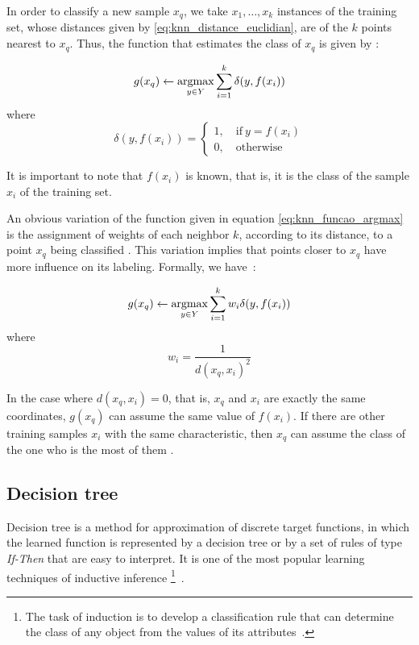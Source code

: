 In order to classify a new sample $x_q$, we take $x_1, \ldots, x_k$ instances of the training set, whose distances given by \ref{eq:knn_distance_euclidian}, are of the $k$ points nearest to $x_q$. Thus, the function that estimates the class of $x_q$ is given by \citep{mitchell:97}:

\begin{equation}
\label{eq:knn_funcao_argmax}
g(x_q) \gets \operatorname*{argmax}_{y \in Y} \sum_{i=1}^k \delta (y, f(x_i))
\end{equation}
\noindent where
\begin{equation}
\label{eq:knn_delta}
  \delta (y, f(x_i)) =  \begin{cases}
                1, \quad \text{if}\ y = f(x_i) \\
                0, \quad \text{otherwise}
              \end{cases}
\end{equation}

It is important to note that $f(x_i)$ is known, that is, it is the class of the sample $x_i$ of the training set.

An obvious variation of the function given in equation \ref{eq:knn_funcao_argmax} is the assignment of weights of each neighbor $k$, according to its distance, to a point $x_q$ being classified \citep{mitchell:97}. This variation implies that points closer to $x_q$ have more influence on its labeling. Formally, we have~\citep{mitchell:97}:

\begin{equation}
\label{eq:knn_funcao_argmax_pesos}
g(x_q) \gets \operatorname*{argmax}_{y \in Y} \sum_{i=1}^k w_i \delta (y, f(x_i))
\end{equation}
\noindent where
\begin{equation}
\label{eq:knn_funcao_peso}
  w_i = \frac{1}{d(x_q, x_i)^2}
\end{equation}

In the case where $d(x_q, x_i) = 0$, that is, $x_q$ and $x_i$ are exactly the same coordinates, $g(x_q)$ can assume the same value of $f(x_i)$. If there are other training samples $x_i$ with the same characteristic, then $x_q$ can assume the class of the one who is the most of them \citep{mitchell:97}.



\subsection{Decision tree}
\label{sec:classifiers_dt}
Decision tree is a method for approximation of discrete target functions, in which the learned function is represented by a decision tree or by a set of rules of type \emph{If-Then} that are easy to interpret. It is one of the most popular learning techniques of inductive inference \footnote{The task of induction is to develop a classification rule that can determine the class of any object from the values of its attributes~\citep{quinlan:86}.}~\citep{mitchell:97}.

